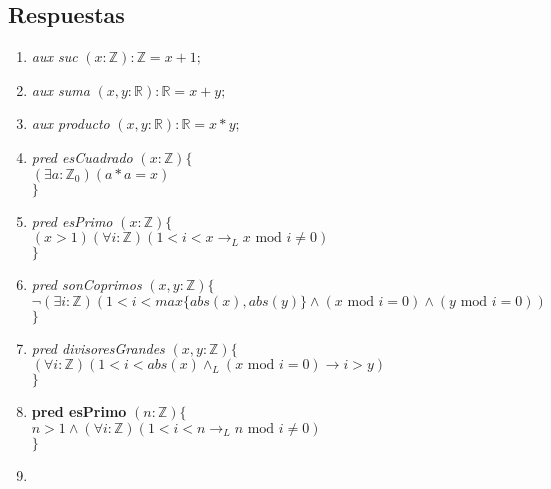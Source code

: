 \documentclass[a4paper]{article}
\begin{document}
\subsection*{Respuestas}

\begin{enumerate}[label=\alph*)]
\item \textit{aux suc} $(x: \mathbb{Z}):\mathbb{Z}=x+1;$ 
\item \textit{aux suma} $(x,y: \mathbb{R}):\mathbb{R}=x+y;$
\item \textit{aux producto} $(x,y: \mathbb{R}):\mathbb{R}=x*y;$
\item \textit{pred esCuadrado} $(x: \mathbb{Z})\{$\\ 
\hspace*{6mm}$(\exists a :\mathbb{Z}_0)(a*a=x)$\\
$\}$
\item \textit{pred esPrimo} $(x: \mathbb{Z})\{$\\ 
\hspace*{6mm}$ (x > 1)(\forall i :\mathbb{Z})(1<i<x \rightarrow _L x\textrm{ mod }i\neq 0 )$\\
$\}$
\item \textit{pred sonCoprimos} $(x,y: \mathbb{Z})\{$\\  
\hspace*{6mm}$ \neg (\exists i :\mathbb{Z})(1<i<max\{abs(x),abs(y)\} \wedge (x\textrm{ mod }i=0)\wedge (y\textrm{ mod }i=0))$\\
$\}$
\item \textit{pred divisoresGrandes} $(x,y: \mathbb{Z})\{$\\
\hspace*{6mm}$ (\forall i :\mathbb{Z})(1<i<abs(x) \wedge _L(x\textrm{ mod }i=0 ) \rightarrow  i>y)$\\
$\}$

\item \textbf{pred esPrimo} $(n: \mathbb{Z})\{$\\ 
			\hspace*{6mm}$ n > 1 \wedge(\forall i :\mathbb{Z})
			(1<i<n \rightarrow _L n\textrm{ mod }i\neq 0 )$\\
			\hspace*{5mm}$\}$\smallskip \\
\item
\end{enumerate}
\end{document}
